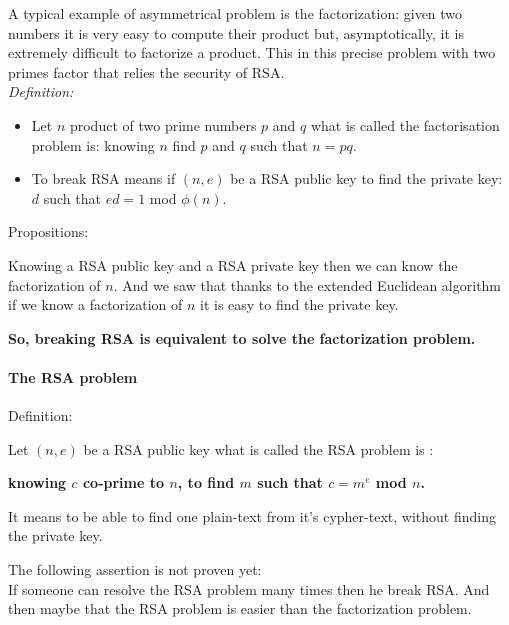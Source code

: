 A typical example of asymmetrical problem is the factorization: 
given two numbers it is very easy to compute their product 
but, asymptotically, it is extremely difficult to factorize a product. 
This in this precise problem with two primes factor that relies the security of RSA.\\ 
\textit{Definition:}
\begin{itemize}
\item Let $n$ product of two prime numbers $p$ and $q$ what is called the factorisation problem is:
knowing $n$ find $p$ and $q$ such that $n = pq$.
\item To break RSA means if  $(n,e)$ be a RSA public key to find the private key: 
$d$ such that $e d = 1$ mod $\phi(n)$.
\end{itemize}
Propositions:

Knowing a RSA public key and a RSA private key then we can know the factorization of $n$. 
And we saw that thanks to the extended Euclidean algorithm if we know a factorization of $n$ 
it is easy to find the private key.
\begin{center}
\textbf{So, breaking RSA is equivalent to solve the factorization problem.}
\end{center}



\paragraph*{The RSA problem}

Definition:

Let $(n,e)$ be a RSA public key what is called the RSA problem is :
\begin{center}
\textbf{knowing $c$ co-prime to $n$, to find $m$ such that $c = m^e$ mod $n$.}
\end{center}
It means to be able to find one plain-text from it's cypher-text, 
without finding the private key.

The following assertion is not proven yet:\\
If someone can resolve the RSA problem many times then he break RSA. 
And then maybe that the RSA problem is easier than the factorization problem.


